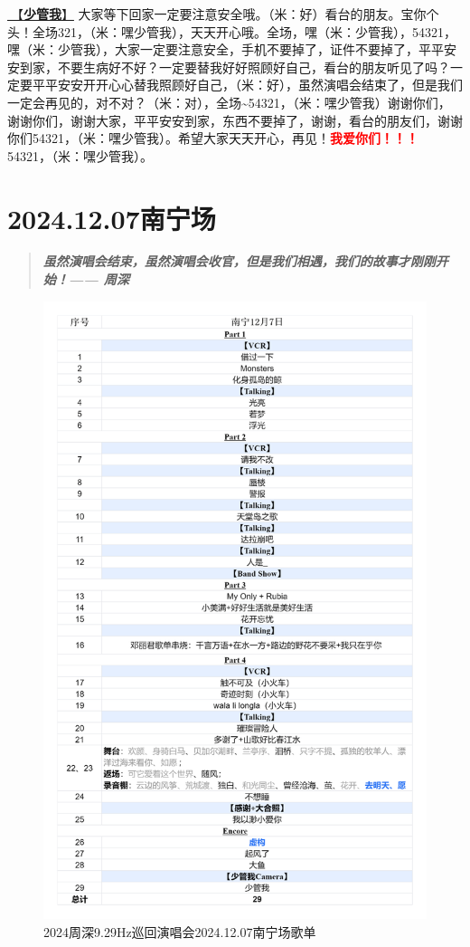 \documentclass[]{ctexbook}
\begin{document}
\hyperref[watch-ur-manners]{🎵【\textbf{少管我}】} 大家等下回家一定要注意安全哦。（米：好）看台的朋友。宝你个头！全场321，（米：嘿少管我），天天开心哦。全场，嘿（米：少管我），54321，嘿（米：少管我），大家一定要注意安全，手机不要掉了，证件不要掉了，平平安安到家，不要生病好不好？一定要替我好好照顾好自己，看台的朋友听见了吗？一定要平平安安开开心心替我照顾好自己，（米：好），虽然演唱会结束了，但是我们一定会再见的，对不对？（米：对），全场\textasciitilde54321，（米：嘿少管我）谢谢你们，谢谢你们，谢谢大家，平平安安到家，东西不要掉了，谢谢，看台的朋友们，谢谢你们54321，（米：嘿少管我）。希望大家天天开心，再见！\textbf{\textcolor{red}{我爱你们！！！} }54321，（米：嘿少管我）。

\chapter{2024.12.07南宁场}\label{nanning-20241207}

\begin{quote}
\textbf{\emph{虽然演唱会结束，虽然演唱会收官，但是我们相遇，我们的故事才刚刚开始！------ 周深}}
\end{quote}

\begin{figure}

{\centering \includegraphics[width=320pt]{img/playlists/playlists-nanning-20241207} 

}

\caption{2024周深9.29Hz巡回演唱会2024.12.07南宁场歌单}\label{fig:unnamed-chunk-144}
\end{figure}
\end{document}

